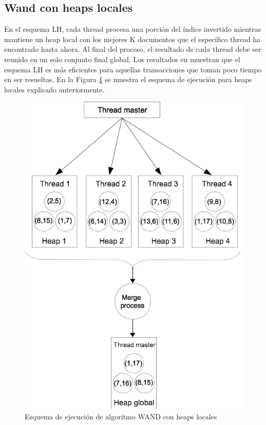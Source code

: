 \subsection{Wand con heaps locales}
\label{scheduling:whl}
En el esquema LH, cada thread procesa una porción del índice invertido mientras mantiene un heap local con los mejores K documentos que el específico thread ha encontrado hasta ahora. Al final del proceso, el resultado de cada thread debe ser reunido en un solo conjunto final global. Los resultados en \citep{Rojas:2013} muestran que el esquema LH es más eficientes para aquellas transacciones que toman poco tiempo en ser resueltas. En la Figura \ref{fig:wand-heap-local} se muestra el esquema de ejecución para heaps locales explicado anteriormente. 

\begin{figure}[tp]
\centering
\includegraphics[scale=.75]{images/wand-heap-local.png}
\caption{Esquema de ejecución de algoritmo WAND con heaps locales}
\label{fig:wand-heap-local}
\end{figure}


